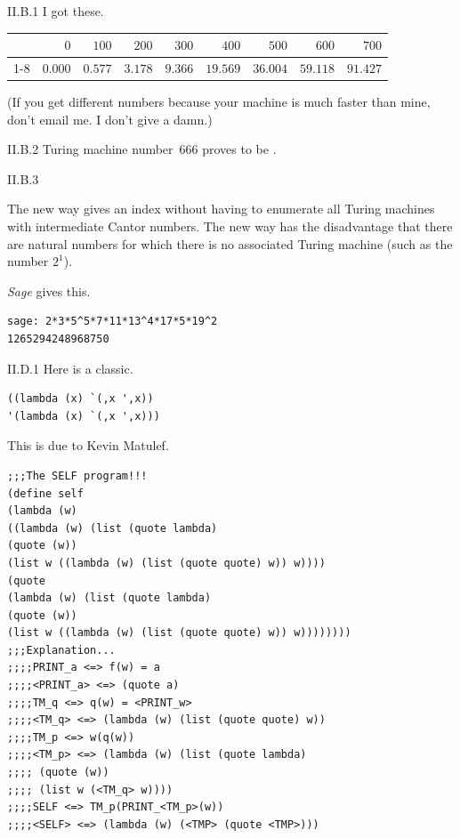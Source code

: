 %
%
%
%
\begin{ans}{II.B.1}
I got these.
\begin{tabular}{r|rrrrrrrr}
   &$0$     &$100$   &$200$   &$300$
              &$400$    &$500$     &$600$    &$700$  \\ \cline{1-8}
   &$0.000$ &$0.577$   &$3.178$   &$9.366$
              &$19.569$ &$36.004$  &$59.118$ &$91.427$
\end{tabular}
(If you get different numbers because your machine is much faster than mine,
don't email me.
I don't give a damn.)
\end{ans}
%
\begin{ans}{II.B.2}
Turing machine number~$666$ proves to be
.
\end{ans}
%
\begin{ans}{II.B.3}
\begin{exparts}
\item The new way gives an index without having to enumerate all
Turing machines with intermediate Cantor numbers.
The new way has the disadvantage that there are natural numbers for which there
is no associated Turing machine (such as the number $2^1$).
\item \textit{Sage} gives this.
\begin{lstlisting}
sage: 2*3*5^5*7*11*13^4*17*5*19^2
1265294248968750
\end{lstlisting}
\end{exparts}
\end{ans}
%
\begin{ans}{II.D.1}
Here is a classic. %
\begin{lstlisting}
((lambda (x) `(,x ',x))
'(lambda (x) `(,x ',x)))
\end{lstlisting}

This is due to Kevin Matulef.  %
\begin{lstlisting}
;;;The SELF program!!!
(define self
(lambda (w)
((lambda (w) (list (quote lambda)
(quote (w))
(list w ((lambda (w) (list (quote quote) w)) w))))
(quote
(lambda (w) (list (quote lambda)
(quote (w))
(list w ((lambda (w) (list (quote quote) w)) w))))))))
;;;Explanation...
;;;;PRINT_a <=> f(w) = a
;;;;<PRINT_a> <=> (quote a)
;;;;TM_q <=> q(w) = <PRINT_w>
;;;;<TM_q> <=> (lambda (w) (list (quote quote) w))
;;;;TM_p <=> w(q(w))
;;;;<TM_p> <=> (lambda (w) (list (quote lambda)
;;;; (quote (w))
;;;; (list w (<TM_q> w))))
;;;;SELF <=> TM_p(PRINT_<TM_p>(w))
;;;;<SELF> <=> (lambda (w) (<TMP> (quote <TMP>)))
\end{lstlisting}
\end{ans}
